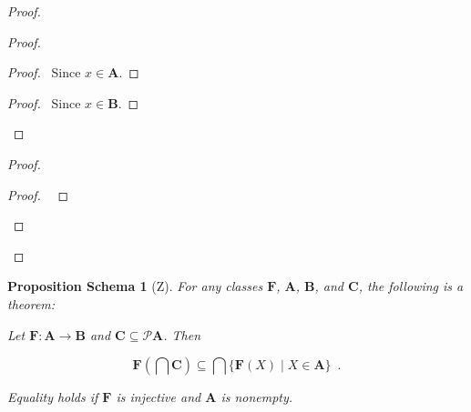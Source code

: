 \documentclass{book}
\let\qed\relax
\newtheorem{props}[ax]{Proposition Schema}
\theoremstyle{definition}
\begin{document}
\begin{proof}
\pf
{}
\begin{proof}
	\begin{proof}
		\pf\ Since $x \in \mathbf{A}$.
	\end{proof}
	\begin{proof}
		\pf\ Since $x \in \mathbf{B}$.
	\end{proof}
\end{proof}
\begin{proof}
	\begin{proof}
		\pf\ 
	\end{proof}
\end{proof}
\qed
\end{proof}

\begin{props}[Z]
\label{prop:imgint}
For any classes $\mathbf{F}$, $\mathbf{A}$, $\mathbf{B}$, and $\mathbf{C}$, the following is a theorem:

Let $\mathbf{F} : \mathbf{A} \rightarrow \mathbf{B}$ and $\mathbf{C} \subseteq \mathcal{P} \mathbf{A}$. Then

\[ \mathbf{F} \left( \bigcap \mathbf{C} \right) \subseteq \bigcap \{ \mathbf{F}(X) \mid X \in \mathbf{A} \} \enspace . \]

Equality holds if $\mathbf{F}$ is injective and $\mathbf{A}$ is nonempty.
\end{props}
\end{document}
